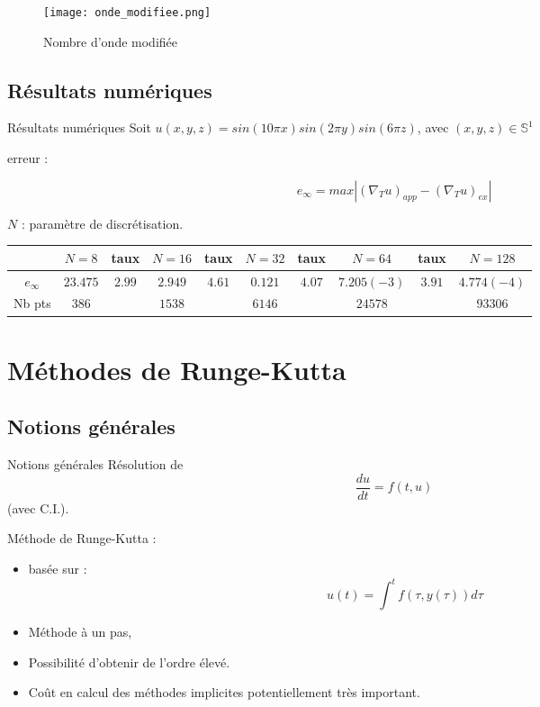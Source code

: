 \documentclass[11pt]{beamer}
\begin{document}
\begin{frame}
\begin{figure}
\begin{center}
\texttt{[image: onde\_modifiee.png]}
\caption{Nombre d'onde modifiée}
\end{center}
\end{figure}

\end{frame}

\subsection{Résultats numériques}
\begin{frame}{Résultats numériques}
Soit $u(x,y,z) = sin(10 \pi x)sin(2 \pi y) sin(6 \pi z)$, avec
$(x,y,z) \in \mathbb{S}^1$

erreur :

$$e_{\infty} = max | (\nabla_T u)_{app} - (\nabla_T u)_{ex} |$$

$N$ : paramètre de discrétisation.

\begin{center}
\tiny{\begin{tabular}{|c||c|c|c|c|c|c|c|c|c|}
\hline 
 & $N=8$ & taux & $N=16$ & taux & $N=32$ & taux & $N=64$ & taux & $N=128$ \\ 
\hline 
\hline
$e_{\infty}$ & $23.475$ & $2.99$ & $2.949$ & $4.61$ & $0.121$ & $4.07$ & $7.205(-3)$ & $3.91$ & $4.774(-4)$ \\ 
\hline 
Nb pts & $386$ &  & $1538$ &  & $6146$ &  & $24578$ &  &
$93306$\\
\hline
\end{tabular} }
\end{center}

\end{frame}


\section{Méthodes de Runge-Kutta}

\subsection{Notions générales}
\begin{frame}{Notions générales}
Résolution de $$\dfrac{du}{dt} = f(t,u)$$ (avec C.I.).

\begin{block}{}
Méthode de Runge-Kutta :
\begin{itemize}
\item basée sur :
$$u(t) = \int^t f(\tau,y(\tau))d\tau$$
\item Méthode à un pas,
\item Possibilité d'obtenir de l'ordre élevé.
\item Co\^ut en calcul des méthodes implicites potentiellement très important.
\end{itemize}
\end{block}

\end{frame}
\end{document}
